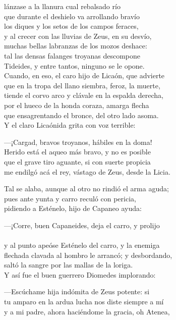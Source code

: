 lánzase a la llanura cual rebalsado río\\
que durante el deshielo va arrollando bravío\\
los diques y los setos de los campos feraces,\\
y al crecer con las lluvias de Zeus, en su desvío,\\
muchas bellas labranzas de los mozos deshace:\\
tal las densas falanges troyanas descompone\\
Tideides, y entre tantos, ninguno se le opone.\\
Cuando, en eso, el caro hijo de Licaón, que advierte\\
que en la tropa del llano siembra, feroz, la muerte,\\
tiende el corvo arco y clávale en la espalda derecha,\\
por el hueco de la honda coraza, amarga flecha\\
que ensagrentando el bronce, del otro lado asoma.\\
Y el claro Licaónida grita con voz terrible:\par
---¡Cargad, bravos troyanos, hábiles en la doma!\\
Herido está el aqueo más bravo, y no es posible\\
que el grave tiro aguante, si con suerte propicia\\
me endilgó acá el rey, vástago de Zeus, desde la Licia.\par
Tal se alaba, aunque al otro no rindió el arma aguda;\\
pues ante yunta y carro reculó con pericia,\\
pidiendo a Esténelo, hijo de Capaneo ayuda:\par
---¡Corre, buen Capaneides, deja el carro, y prolijo\\
\\
y al punto apeóse Esténelo del carro, y la enemiga\\
flechada clavada al hombro le arrancó; y desbordando,\\
saltó la sangre por las mallas de la loriga.\\
Y así fue el buen guerrero Diomedes implorando:\par
---Escúchame hija indómita de Zeus potente: si\\
tu amparo en la ardua lucha nos diste siempre a mí\\
y a mi padre, ahora haciéndome la gracia, oh Atenea,\\
